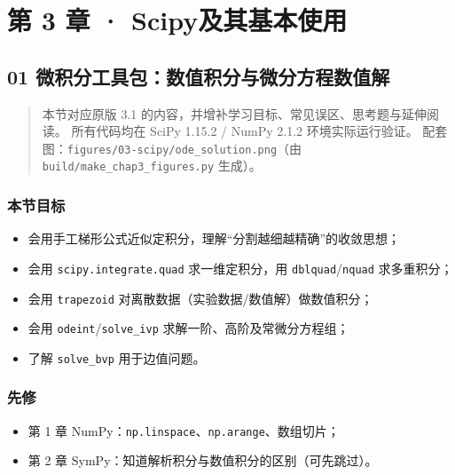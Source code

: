 \chapter{第 3 章 ·
Scipy及其基本使用}\label{ux7b2c-3-ux7ae0-scipyux53caux5176ux57faux672cux4f7fux7528}

\section{01
微积分工具包：数值积分与微分方程数值解}\label{ux5faeux79efux5206ux5de5ux5177ux5305ux6570ux503cux79efux5206ux4e0eux5faeux5206ux65b9ux7a0bux6570ux503cux89e3}

\begin{quote}
本节对应原版 3.1 的内容，并增补学习目标、常见误区、思考题与延伸阅读。
所有代码均在 SciPy 1.15.2 / NumPy 2.1.2 环境实际运行验证。
配套图：\texttt{figures/03-scipy/ode\_solution.png}（由
\texttt{build/make\_chap3\_figures.py} 生成）。
\end{quote}

\subsection{本节目标}\label{ux672cux8282ux76eeux6807-13}

\begin{itemize}
\tightlist
\item
  会用手工梯形公式近似定积分，理解``分割越细越精确''的收敛思想；
\item
  会用 \texttt{scipy.integrate.quad} 求一维定积分，用
  \texttt{dblquad}/\texttt{nquad} 求多重积分；
\item
  会用 \texttt{trapezoid} 对离散数据（实验数据/数值解）做数值积分；
\item
  会用 \texttt{odeint}/\texttt{solve\_ivp}
  求解一阶、高阶及常微分方程组；
\item
  了解 \texttt{solve\_bvp} 用于边值问题。
\end{itemize}

\subsection{先修}\label{ux5148ux4fee-6}

\begin{itemize}
\tightlist
\item
  第 1 章 NumPy：\texttt{np.linspace}、\texttt{np.arange}、数组切片；
\item
  第 2 章 SymPy：知道解析积分与数值积分的区别（可先跳过）。
\end{itemize}

